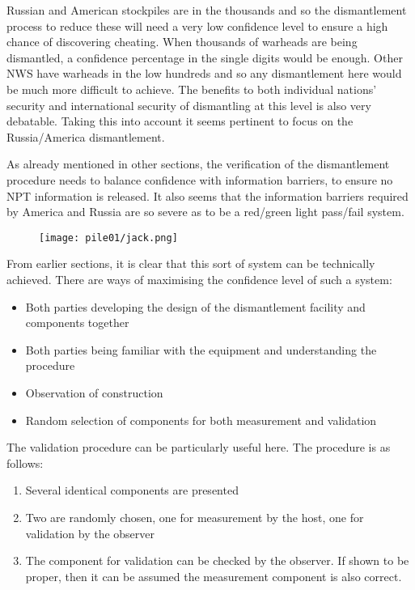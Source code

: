 \documentclass[twoside,titlepage,11pt,twocolumn,a4paper]{article}
\begin{document}
Russian and American stockpiles are in the thousands and so the
dismantlement process to reduce these will need a very low confidence
level to ensure a high chance of discovering cheating. When thousands
of warheads are being dismantled, a confidence percentage in the
single digits would be enough. Other NWS have warheads in the low
hundreds and so any dismantlement here would be much more difficult to
achieve.  The benefits to both individual nations' security and
international security of dismantling at this level is also very
debatable. Taking this into account it seems pertinent to focus on the
Russia/America dismantlement.

As already mentioned in other sections, the verification of the
dismantlement procedure needs to balance confidence with information
barriers, to ensure no NPT information is released. It also seems that
the information barriers required by America and Russia are so severe
as to be a red/green light pass/fail system.

\begin{figure}
  \texttt{[image: pile01/jack.png]}
\end{figure}

From earlier sections, it is clear that this sort of system can be
technically achieved. There are ways of maximising the confidence
level of such a system:
\begin{itemize}
  \item Both parties developing the design of the dismantlement
    facility and components together
  \item Both parties being familiar with the equipment and
    understanding the procedure
  \item Observation of construction
  \item Random selection of components for both measurement and
    validation
\end{itemize}

The validation procedure can be particularly useful here. The
procedure is as follows:
\begin{enumerate}
  \item Several identical components are presented
  \item Two are randomly chosen, one for measurement by the host, one
    for validation by the observer
  \item The component for validation can be checked by the
    observer. If shown to be proper, then it can be assumed the
    measurement component is also correct.
\end{enumerate}
\end{document}
